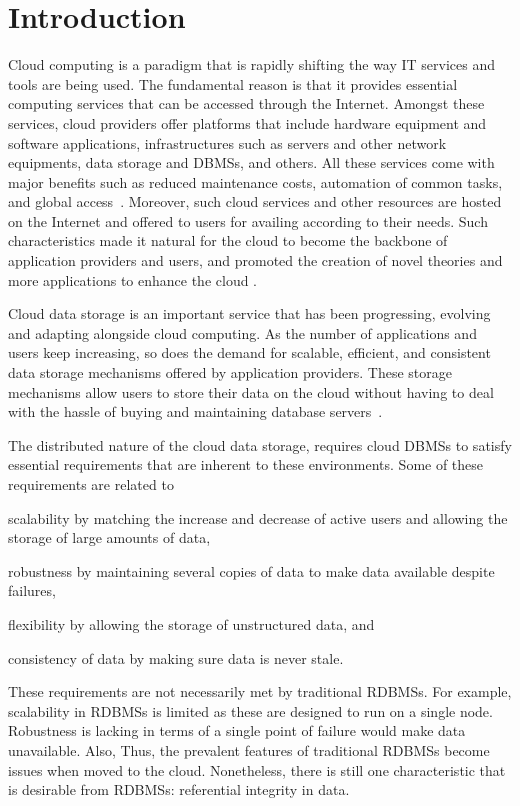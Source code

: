 \chapter{Introduction}

% 
  
Cloud computing is a paradigm that is rapidly shifting the way IT services
and tools are being used. The fundamental reason is that it provides
 essential computing services that can be accessed through the Internet. 
 Amongst these services, cloud providers offer platforms that
 include hardware equipment and software applications, infrastructures such as
 servers and other network equipments, data storage and \acp{DBMS}, and
 others. All these services come with major benefits such as reduced maintenance
 costs,  automation of common tasks, and global access~\citep{wilkes}. Moreover, such cloud
 services and other resources are hosted on the Internet and offered to  
 users for availing according to their needs.  Such characteristics made it
  natural for the  cloud to become  the backbone of application providers and
  users, and promoted the creation of novel theories and more applications to
 enhance the cloud .
 
  
  Cloud data storage is an important service that has been progressing, evolving
  and adapting alongside cloud computing. As the number of
  applications and users keep increasing, so does the demand for scalable, 
  efficient, and consistent data storage mechanisms offered by
  application providers. These storage mechanisms allow  users to store
  their data on the cloud without having to deal with the hassle of buying and
  maintaining database servers~\citep{SNIA}.

 The distributed nature of the cloud data storage, requires
 cloud \acp{DBMS} to satisfy essential requirements that are inherent to these
 environments. Some of these requirements are related to
  \begin{inparaenum}[a)]
 \item  scalability by matching the increase and decrease of active users
 and allowing the storage of large amounts of data,
 \item  robustness by maintaining several copies of data to make data
 available despite failures,
 \item  flexibility by allowing the storage of unstructured data, and
 \item  consistency of data by making sure data is never stale.
 \end{inparaenum}
   These requirements are not necessarily met by traditional \acp{RDBMS}. For
   example, scalability in \acp{RDBMS} is limited as these are designed to run
   on a single node. Robustness is lacking in terms of  a single point of
   failure would  make data unavailable. Also,     Thus, the  prevalent
   features of traditional \acp{RDBMS}  become issues when moved to the cloud.
    Nonetheless, there is still one characteristic that is desirable from
   \acp{RDBMS}: referential integrity in data.
   
